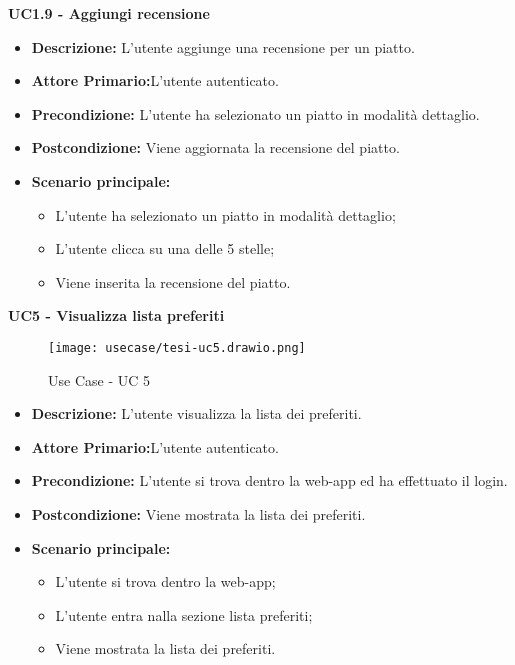\textbf{UC1.9 - Aggiungi recensione}
\begin{itemize}
    \item \textbf{Descrizione:} L'utente aggiunge una recensione per un piatto.
    \item \textbf{Attore Primario:}L'utente autenticato.
    \item \textbf{Precondizione:} L'utente ha selezionato un piatto in modalità dettaglio.
    \item \textbf{Postcondizione:} Viene aggiornata la recensione del piatto.
    \item \textbf{Scenario principale:}
    \begin{itemize}
        \item L'utente ha selezionato un piatto in modalità dettaglio;
        \item L'utente clicca su una delle 5 stelle;
        \item Viene inserita la recensione del piatto.
    \end{itemize}
\end{itemize}
\textbf{UC5 - Visualizza lista preferiti}
\begin{figure}[H]
    \centering
    \texttt{[image: usecase/tesi-uc5.drawio.png]}
    \caption{Use Case - UC 5}
\end{figure}
\begin{itemize}
    \item \textbf{Descrizione:} L'utente visualizza la lista dei preferiti.
    \item \textbf{Attore Primario:}L'utente autenticato.
    \item \textbf{Precondizione:} L'utente si trova dentro la web-app ed ha effettuato il login.
    \item \textbf{Postcondizione:} Viene mostrata la lista dei preferiti.
    \item \textbf{Scenario principale:}
    \begin{itemize}
        \item L'utente si trova dentro la web-app;
        \item L'utente entra nalla sezione lista preferiti;
        \item Viene mostrata la lista dei preferiti.
    \end{itemize}
\end{itemize}

